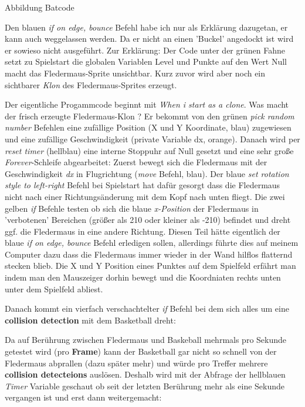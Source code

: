 \begin{center}
\footnotesize{Abbildung Batcode}
\end{center}

Den blauen \textit{if on edge, bounce} Befehl habe ich nur als Erklärung dazugetan, er kann auch weggelassen werden. Da er nicht an einen 'Buckel' angedockt ist wird er sowieso nicht ausgeführt. Zur Erklärung: Der Code unter der grünen Fahne setzt zu Spielstart die globalen Variablen Level und Punkte auf den Wert Null macht das Fledermaus-Sprite unsichtbar. Kurz zuvor wird aber noch ein sichtbarer \textit{Klon} des Fledermaus-Sprites erzeugt. 

Der eigentliche Progammcode beginnt mit \textit{When i start as a clone}. Was macht der frisch erzeugte Fledermaus-Klon ? Er bekommt von den grünen \textit{pick random number} Befehlen eine zufällige Position (X und Y Koordinate, blau) zugewiesen und eine zufällige Geschwindigkeit (private Variable dx, orange). Danach wird per \textit{reset timer} (hellblau) eine interne Stoppuhr auf Null gesetzt und eine sehr große \textit{Forever}-Schleife abgearbeitet: Zuerst bewegt sich die Fledermaus mit der Geschwindigkeit \textit{dx} in Flugrichtung (\textit{move} Befehl, blau). Der blaue \textit{set rotation style to left-right} Befehl bei Spielstart hat dafür gesorgt dass die Fledermaus nicht nach einer Richtungsänderung mit dem Kopf nach unten fliegt. Die zwei gelben \textit{if} Befehle testen ob sich die blaue \textit{x-Position} der Fledermaus in 'verbotenen' Bereichen (größer als 210 oder kleiner als -210) befindet und dreht ggf. die Fledermaus in eine andere Richtung. Diesen Teil hätte eigentlich der blaue \textit{if on edge, bounce} Befehl erledigen sollen, allerdings führte dies auf meinem Computer dazu dass die Fledermaus immer wieder in der Wand hilflos flatternd stecken blieb. Die X und Y Position eines Punktes auf dem Spielfeld erfährt man indem man den Mauszeiger dorhin bewegt und die Koordniaten rechts unten unter dem Spielfeld abliest.

Danach kommt ein vierfach verschachtelter \textit{if} Befehl bei dem sich alles um eine \textbf{collision detection} mit dem Basketball dreht:

Da auf Berührung zwischen Fledermaus und Baskeball mehrmals pro Sekunde getestet wird (pro \textbf{Frame}) kann der Basketball gar nicht so schnell von der Fledermaus abprallen (dazu später mehr) und würde pro Treffer mehrere \textbf{collision detecteions} auslösen. Deshalb wird mit der Abfrage der hellblauen \textit{Timer} Variable geschaut ob seit der letzten Berührung mehr als eine Sekunde vergangen ist und erst dann weitergemacht:

